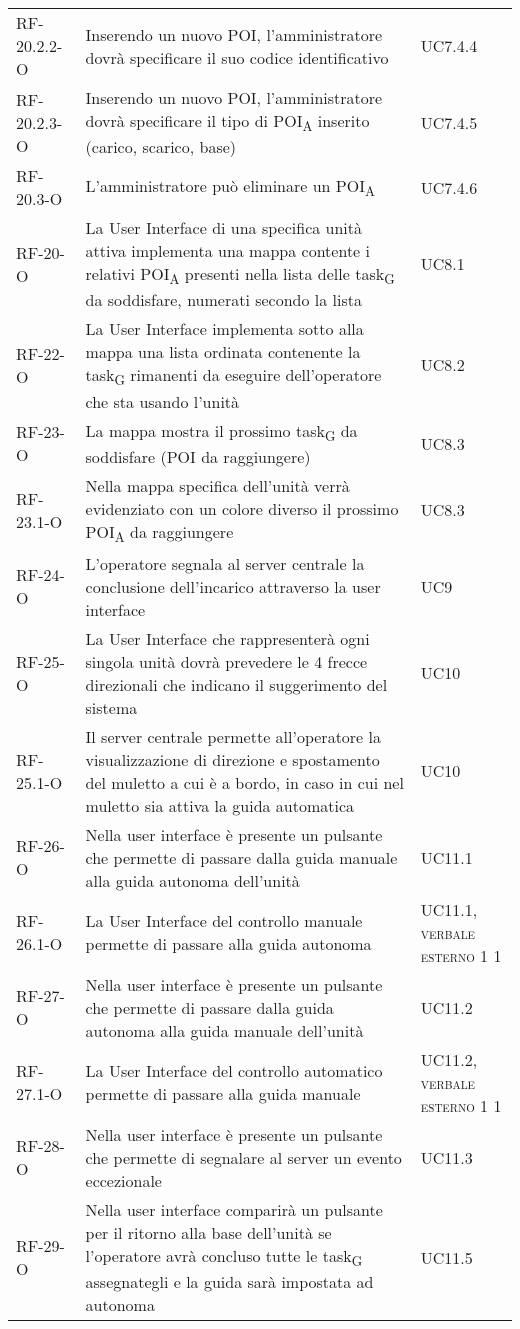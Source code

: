 \begin{longtable}{ 
		>{}p{} 
		>{}p{}
		>{\centering}p{} }
RF-20.2.2-O	&	Inserendo un nuovo POI, l'amministratore dovrà specificare il suo codice identificativo	&	UC7.4.4\tabularnewline
RF-20.2.3-O	&	Inserendo un nuovo POI, l'amministratore dovrà specificare il tipo di \acrshort{POI}\textsubscript{A} inserito (carico, scarico, base)	&	UC7.4.5\tabularnewline
RF-20.3-O		&	L'amministratore può eliminare un \acrshort{POI}\textsubscript{A}	&	UC7.4.6\tabularnewline
RF-20-O		&	La User Interface di una specifica unità attiva implementa una mappa contente i relativi \acrshort{POI}\textsubscript{A} presenti nella lista delle \gls{task}\textsubscript{G} da soddisfare, numerati secondo la lista	&	UC8.1\tabularnewline
RF-22-O		&	La User Interface implementa sotto alla mappa una lista ordinata contenente la \gls{task}\textsubscript{G} rimanenti da eseguire dell'operatore che sta usando l'unità	&	UC8.2\tabularnewline
RF-23-O		&	La mappa mostra il prossimo \gls{task}\textsubscript{G} da soddisfare (POI da raggiungere) 	&	UC8.3\tabularnewline
RF-23.1-O		&	Nella mappa specifica dell'unità verrà evidenziato con un colore diverso il prossimo \acrshort{POI}\textsubscript{A} da raggiungere	&	UC8.3\tabularnewline
RF-24-O		&	L'operatore segnala al server centrale la conclusione dell'incarico attraverso la user interface	&	UC9\tabularnewline				
RF-25-O		&	La User Interface che rappresenterà ogni singola unità dovrà prevedere le 4 frecce direzionali che indicano il suggerimento del sistema	&	UC10\tabularnewline
RF-25.1-O		&	Il server centrale permette all'operatore la visualizzazione di direzione e spostamento del muletto a cui è a bordo, in caso in cui nel muletto sia attiva la guida automatica 	&	UC10\tabularnewline				
RF-26-O		&	Nella user interface è presente un pulsante che permette di passare dalla guida manuale alla guida autonoma dell'unità	&	UC11.1\tabularnewline
RF-26.1-O		&	La User Interface del controllo manuale permette di passare alla guida autonoma	&	UC11.1, \textsc{\textsc{verbale esterno 1} 1}\tabularnewline
RF-27-O		&	Nella user interface è presente un pulsante che permette di passare dalla guida autonoma alla guida manuale dell'unità	&	UC11.2\tabularnewline
RF-27.1-O		&	La User Interface del controllo automatico permette di passare alla guida manuale	&	UC11.2, \textsc{\textsc{verbale esterno 1} 1}\tabularnewline
RF-28-O		&	Nella user interface è presente un pulsante che permette di segnalare al server un evento eccezionale	&	UC11.3\tabularnewline
RF-29-O		&	Nella user interface comparirà  un pulsante per il ritorno alla base dell'unità se l'operatore avrà concluso tutte le \gls{task}\textsubscript{G} assegnategli e la guida sarà impostata ad autonoma 	&	UC11.5\tabularnewline 

\end{longtable}
